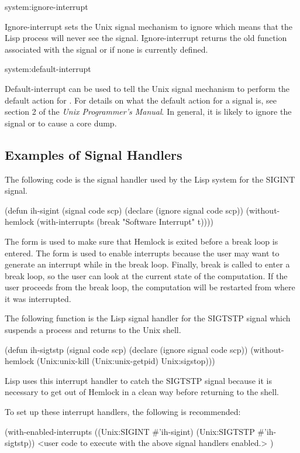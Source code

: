 \begin{defun}{system:}{ignore-interrupt}{}
  
  Ignore-interrupt sets the Unix signal mechanism to ignore
   which means that the Lisp process will never see the
  signal.  Ignore-interrupt returns the old function associated with
  the signal or \false{} if none is currently defined.
\end{defun}

\begin{defun}{system:}{default-interrupt}{}
  
  Default-interrupt can be used to tell the Unix signal mechanism to
  perform the default action for .  For details on what
  the default action for a signal is, see section 2 of the {\em Unix
    Programmer's Manual}.  In general, it is likely to ignore the
  signal or to cause a core dump.
\end{defun}


\subsection{Examples of Signal Handlers}

The following code is the signal handler used by the Lisp system for the
SIGINT signal.

\begin{lisp}
(defun ih-sigint (signal code scp)
  (declare (ignore signal code scp))
  (without-hemlock
   (with-interrupts
    (break "Software Interrupt" t))))
\end{lisp}

The  form is used to make sure that Hemlock is exited before
a break loop is entered.  The  form is used to enable
interrupts because the user may want to generate an interrupt while in the
break loop.  Finally, break is called to enter a break loop, so the user
can look at the current state of the computation.  If the user proceeds
from the break loop, the computation will be restarted from where it was
interrupted.

The following function is the Lisp signal handler for the SIGTSTP signal
which suspends a process and returns to the Unix shell.

\begin{lisp}
(defun ih-sigtstp (signal code scp)
  (declare (ignore signal code scp))
  (without-hemlock
   (Unix:unix-kill (Unix:unix-getpid) Unix:sigstop)))
\end{lisp}

Lisp uses this interrupt handler to catch the SIGTSTP signal because it is
necessary to get out of Hemlock in a clean way before returning to the shell.

To set up these interrupt handlers, the following is recommended:

\begin{lisp}
(with-enabled-interrupts ((Unix:SIGINT #'ih-sigint)
                          (Unix:SIGTSTP #'ih-sigtstp))
  <user code to execute with the above signal handlers enabled.>
)
\end{lisp}
